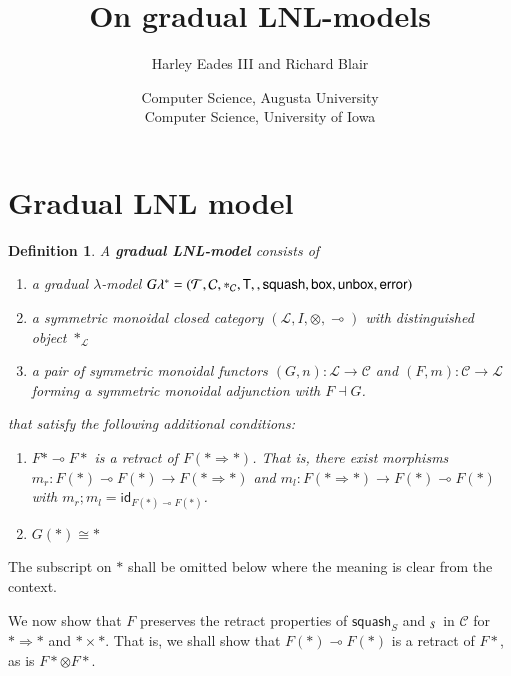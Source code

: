 \documentclass{article}
\date{}
\newtheorem{definition}[theorem]{Definition}
\let\mto\to
\let\to\relax
\newcommand{\to}{\rightarrow}
\let\split\relax
\newcommand{\cat}[1]{\mathcal{#1}}
\newcommand{\id}[0]{\mathsf{id}}
\newcommand{\lolli}{\multimap}
\newcommand{\T}[0]{\mathsf{T}}
\newcommand{\split}[0]{\mathsf{split}}
\newcommand{\squash}[0]{\mathsf{squash}}
\newcommand{\bx}[0]{\mathsf{box}}
\newcommand{\error}[0]{\mathsf{error}}
\newcommand{\unbox}[0]{\mathsf{unbox}}
\begin{document}
\title{\vspace{-45px}On gradual LNL-models}
\author{Harley Eades III and Richard Blair}
\date{Computer Science, Augusta University\\Computer Science, University of Iowa}

\maketitle 

\section{Gradual LNL model}

\begin{definition} A \textbf{gradual LNL-model} consists of
  \begin{enumerate}
  \item a gradual $\lambda$-model $G\lambda^\ast = (\cat{T}, \cat{C}, \ast_{\cat{C}}, \T, \split, \squash, \bx, \unbox, \error)$
  \item a symmetric monoidal closed category $(\cat{L}, I, \otimes, \multimap)$ with distinguished object $\ast_{\cat{L}}$
  \item a pair of symmetric monoidal functors $(G, n) : \cat{L} \mto \cat{C}$ and $(F, m) : \cat{C} \mto \cat{L}$ forming a symmetric monoidal adjunction with $F \dashv G$.
  \end{enumerate}
  that satisfy the following additional conditions:
  \begin{enumerate}
  \item $F\ast \lolli F\ast$ is a retract of $F(\ast \Rightarrow \ast)$. That is, there exist morphisms
    $m_r : F(\ast) \lolli F(\ast) \mto F(\ast \Rightarrow \ast)$ and
    $m_l : F(\ast \Rightarrow \ast) \mto F(\ast) \lolli F(\ast)$ with $m_r ; m_l = \id_{F(\ast) \lolli F(\ast)}$.
  \item $G(\ast) \cong \ast$
  \end{enumerate}

\end{definition}

The subscript on $\ast$ shall be omitted below where the meaning is clear from the context.

We now show that $F$ preserves the retract properties of $\squash_S$ and $\split_S$ in $\cat{C}$ for $\ast \Rightarrow \ast$ and $\ast \times \ast$. That is, we shall show that $F(\ast) \lolli F(\ast)$ is a retract of $F\ast$, as is $F\ast \otimes F\ast$.
\end{document}
